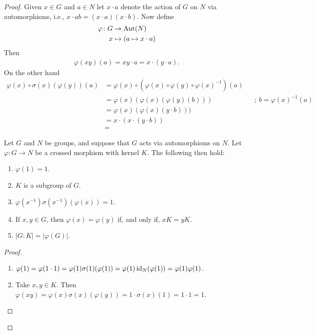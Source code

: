 \begin{solution}
\begin{proof} Given $x\in G$ and $a\in N$ let $x\cdot a$ denote the action of $G$ on $N$ via automorphisms, i.e., $x\cdot ab = (x\cdot a)(x\cdot b)$. Now define
\begin{align*}
    \varphi\colon G&\to{\rm Aut}(N)\\
    x&\mapsto (a\mapsto x\cdot a)
\end{align*}
Then
\begin{align*}
    \varphi(xy)(a) = xy\cdot a
        = x\cdot(y\cdot a).
\end{align*}
On the other hand
\begin{align*}
    \varphi(x)\circ\sigma(x)(\varphi(y))(a) &=
        \varphi(x)\circ(\varphi(x)\circ\varphi(y)\circ\varphi(x)^{-1})(a)\\
        &= \varphi(x)(\varphi(x)(\varphi(y)(b))) &&;\ b=\varphi(x)^{-1}(a)\\
        &= \varphi(x)(\varphi(x)(y\cdot b)))\\
        &= x\cdot(x\cdot(y\cdot b))\\
        &= 
\end{align*}
\fi

\begin{lem}\label{crossed-morphism-props}
    Let\/ $G$ and\/ $N$ be groups, and suppose that\/ $G$ acts via automorphisms on\/ $N$. Let\/ $\varphi: G \rightarrow N$ be a crossed morphism with kernel\/ $K$. The following then hold:
    \begin{enumerate}[\rm a)]
    \item $\varphi(1) = 1$.
    \item $K$ is a subgroup of\/ $G$.
    \item $\varphi(x^{-1})\sigma(x^{-1})(\varphi(x))=1$.
    \item If\/ $x, y \in G$, then\/ $\varphi(x) = \varphi(y)$ if, and only if, $xK = yK$.
    \item $|G : K| = |\varphi(G)|$.
    \end{enumerate}
\end{lem}

\begin{proof}${}$
\begin{enumerate}[\rm a)]
    \item $\varphi(1)=\varphi(1\cdot 1)
        =\varphi(1)\sigma(1)(\varphi(1))
        =\varphi(1)\operatorname{id}_N(\varphi(1))
        =\varphi(1)\varphi(1)$.

    \item Take $x,y\in K$. Then $\varphi(xy)
        =\varphi(x)\sigma(x)(\varphi(y))
        =1\cdot\sigma(x)(1)=1\cdot1=1$.


\end{enumerate}
\end{proof}
\end{proof}
\end{solution}
